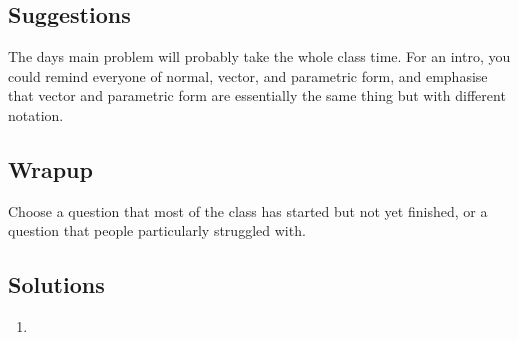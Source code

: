 \documentclass[11pt]{exam}
\begin{document}
\subsection*{Suggestions}
	The days main problem will probably take the whole class time.  For an intro,
	you could remind everyone of normal, vector, and parametric form, and emphasise
	that vector and parametric form are essentially the same thing but
	with different notation.

\subsection*{Wrapup}
	Choose a question that most of the class has started but not yet finished,
	or a question that people particularly struggled with.

\subsection*{Solutions}
\begin{enumerate}
	\item
\end{enumerate}
	
\end{document}
